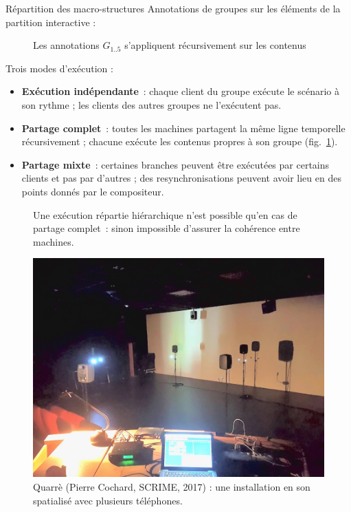 \begin{block}{Répartition des macro-structures}
	Annotations de groupes sur les éléments de la partition interactive : 
    
    \begin{figure}
        \begin{tikzpicture}[scale=4]
        
        \end{tikzpicture}
        \caption{Les annotations $G_{1..5}$ s'appliquent récursivement sur les contenus}
    \end{figure}

	Trois modes d'exécution : 
	\begin{itemize}
		\item \textbf{Exécution indépendante}~: chaque client du groupe exécute le scénario à son rythme ; les clients des autres groupes ne l'exécutent pas.
		\item \textbf{Partage complet}~: toutes les machines partagent la même ligne temporelle récursivement ; chacune exécute les contenus propres à son groupe (fig.~\ref{fig.reparti}).
		\item \textbf{Partage mixte}~: certaines branches peuvent être exécutées par certains clients et pas par d'autres ; des resynchronisations peuvent avoir lieu en des points donnés par le compositeur.
	\end{itemize}
    
    \begin{figure} 
    	\centering
    	\begin{tikzpicture}[scale=4]
            
        \end{tikzpicture}
        \caption{Une exécution répartie hiérarchique n'est possible qu'en cas de partage complet~: sinon impossible d'assurer la cohérence entre machines.}
        \label{fig.reparti}
    \end{figure}
    
    \begin{figure}
        \includegraphics[scale=0.5]{images/quarre.jpg}
        \caption{Quarrè (Pierre Cochard, SCRIME, 2017) : une installation en son spatialisé avec plusieurs téléphones.}
    \end{figure}
\end{block}